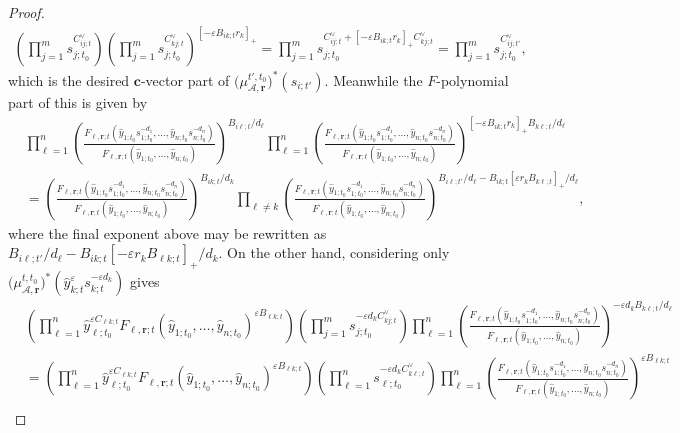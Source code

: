 \documentclass{amsart}
\numberwithin{equation}{section}
\newcommand{\bfc}{\mathbf{c}}
\newcommand{\bfr}{{\boldsymbol{r}}}
\newcommand{\cA}{\mathcal{A}}
\begin{document}
\begin{proof}
\begin{align*}
    \left(\prod_{j=1}^m s_{j;t_0}^{C^\vee_{ij;t}}\right)\left(\prod_{j=1}^m s_{j;t_0}^{C^\vee_{kj;t}}\right)^{[-\varepsilon B_{ik;t} r_k]_+}
    =\prod_{j=1}^m s_{j;t_0}^{C^\vee_{ij;t} + [-\varepsilon B_{ik;t} r_k]_+ C^\vee_{kj;t}}
    =\prod_{j=1}^m s_{j;t_0}^{C^\vee_{ij;t'}},
  \end{align*}
  which is the desired $\bfc$-vector part of $\big(\mu_{\cA,\bfr}^{t',t_0}\big)^*(s_{i;t'})$.
  Meanwhile the $F$-polynomial part of this is given by
  \begin{align*}
    &\prod_{\ell=1}^n \left(\frac{F_{\ell,\bfr;t}(\hat y_{1;t_0} s_{1;t_0}^{-d_1},\ldots,\hat y_{n;t_0} s_{n;t_0}^{-d_n})}{F_{\ell,\bfr;t}(\hat y_{1;t_0},\ldots,\hat y_{n;t_0})}\right)^{B_{i\ell;t}/d_\ell}
    \prod_{\ell=1}^n \left(\frac{F_{\ell,\bfr;t}(\hat y_{1;t_0} s_{1;t_0}^{-d_1},\ldots,\hat y_{n;t_0} s_{n;t_0}^{-d_n})}{F_{\ell,\bfr;t}(\hat y_{1;t_0},\ldots,\hat y_{n;t_0})}\right)^{[-\varepsilon B_{ik;t} r_k]_+ B_{k\ell;t}/d_\ell}\\
    & = \left(\frac{F_{\ell,\bfr;t}(\hat y_{1;t_0} s_{1;t_0}^{-d_1},\ldots,\hat y_{n;t_0} s_{n;t_0}^{-d_n})}{F_{\ell,\bfr;t}(\hat y_{1;t_0},\ldots,\hat y_{n;t_0})}\right)^{B_{ik;t}/d_k}
    \prod_{\ell\ne k} \left(\frac{F_{\ell,\bfr;t}(\hat y_{1;t_0} s_{1;t_0}^{-d_1},\ldots,\hat y_{n;t_0} s_{n;t_0}^{-d_n})}{F_{\ell,\bfr;t}(\hat y_{1;t_0},\ldots,\hat y_{n;t_0})}\right)^{B_{i\ell;t'}/d_\ell-B_{ik;t} [\varepsilon r_k B_{k\ell;t}]_+/d_\ell},
  \end{align*}
  where the final exponent above may be rewritten as $B_{i\ell;t'}/d_\ell-B_{ik;t} [-\varepsilon r_k B_{\ell k;t}]_+/d_k$.
  On the other hand, considering only $\big(\mu_{\cA,\bfr}^{t,t_0}\big)^*\left(\hat y_{k;t}^\varepsilon s_{k;t}^{-\varepsilon d_k}\right)$ gives
  \begin{align*}
    \nonumber &\left(\prod_{\ell=1}^n \hat y_{\ell;t_0}^{\varepsilon C_{\ell k;t}} F_{\ell,\bfr;t}(\hat y_{1;t_0},\ldots,\hat y_{n;t_0})^{\varepsilon B_{\ell k;t}}\right) \left(\prod_{j=1}^m s_{j;t_0}^{-\varepsilon d_k C^\vee_{kj;t}}\right) \prod_{\ell=1}^n \left(\frac{F_{\ell,\bfr;t}(\hat y_{1;t_0} s_{1;t_0}^{-d_1},\ldots,\hat y_{n;t_0} s_{n;t_0}^{-d_n})}{F_{\ell,\bfr;t}(\hat y_{1;t_0},\ldots,\hat y_{n;t_0})}\right)^{-\varepsilon d_k B_{k\ell;t}/d_\ell}\\
    \nonumber &=\left(\prod_{\ell=1}^n \hat y_{\ell;t_0}^{\varepsilon C_{\ell k;t}} F_{\ell,\bfr;t}(\hat y_{1;t_0},\ldots,\hat y_{n;t_0})^{\varepsilon B_{\ell k;t}}\right) \left(\prod_{\ell=1}^n s_{\ell;t_0}^{-\varepsilon d_k C^\vee_{k\ell;t}}\right) \prod_{\ell=1}^n \left(\frac{F_{\ell,\bfr;t}(\hat y_{1;t_0} s_{1;t_0}^{-d_1},\ldots,\hat y_{n;t_0} s_{n;t_0}^{-d_n})}{F_{\ell,\bfr;t}(\hat y_{1;t_0},\ldots,\hat y_{n;t_0})}\right)^{\varepsilon B_{\ell k;t}}\\

\end{align*}
\end{proof}
\end{document}
